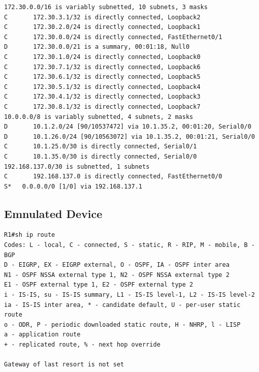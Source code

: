 \documentclass[11pt]{report}
\begin{document}
\begin{appendices}
\begin{lstlisting}
172.30.0.0/16 is variably subnetted, 10 subnets, 3 masks
C       172.30.3.1/32 is directly connected, Loopback2
C       172.30.2.0/24 is directly connected, Loopback1
C       172.30.0.0/24 is directly connected, FastEthernet0/1
D       172.30.0.0/21 is a summary, 00:01:18, Null0
C       172.30.1.0/24 is directly connected, Loopback0
C       172.30.7.1/32 is directly connected, Loopback6
C       172.30.6.1/32 is directly connected, Loopback5
C       172.30.5.1/32 is directly connected, Loopback4
C       172.30.4.1/32 is directly connected, Loopback3
C       172.30.8.1/32 is directly connected, Loopback7
10.0.0.0/8 is variably subnetted, 4 subnets, 2 masks
D       10.1.2.0/24 [90/10537472] via 10.1.35.2, 00:01:20, Serial0/0
D       10.1.26.0/24 [90/10563072] via 10.1.35.2, 00:01:21, Serial0/0
C       10.1.25.0/30 is directly connected, Serial0/1
C       10.1.35.0/30 is directly connected, Serial0/0
192.168.137.0/30 is subnetted, 1 subnets
C       192.168.137.0 is directly connected, FastEthernet0/0
S*   0.0.0.0/0 [1/0] via 192.168.137.1
\end{lstlisting}

\subsection{Emnulated Device}
\begin{lstlisting}
R1#sh ip route
Codes: L - local, C - connected, S - static, R - RIP, M - mobile, B - BGP
D - EIGRP, EX - EIGRP external, O - OSPF, IA - OSPF inter area
N1 - OSPF NSSA external type 1, N2 - OSPF NSSA external type 2
E1 - OSPF external type 1, E2 - OSPF external type 2
i - IS-IS, su - IS-IS summary, L1 - IS-IS level-1, L2 - IS-IS level-2
ia - IS-IS inter area, * - candidate default, U - per-user static route
o - ODR, P - periodic downloaded static route, H - NHRP, l - LISP
a - application route
+ - replicated route, % - next hop override

Gateway of last resort is not set


\end{lstlisting}
\end{appendices}
\end{document}
